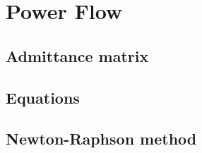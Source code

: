 \section{Power Flow}

\begin{frame}{}
    \tableofcontents[currentsection]
\end{frame}



\subsection{Admittance matrix}



\subsection{Equations}





\subsection{Newton-Raphson method}



